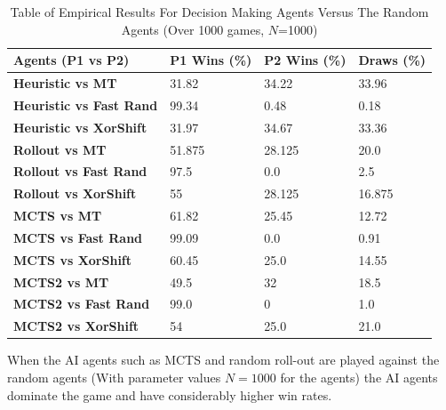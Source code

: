\documentclass[journal]{IEEEtran}
\begin{document}
\begin{table}[H]
  \centering
  \caption{Table of Empirical Results For Decision Making Agents Versus The Random Agents (Over 1000 games, $N$=1000)}
  \label{results-table-rnd-results}
  \begin{tabular}{|l|l|l|l|}
  \hline
  \textbf{Agents (P1 vs P2)}      & \textbf{P1 Wins (\%)} & \textbf{P2 Wins (\%)} & \textbf{Draws (\%)} \\ \hline
  \textbf{Heuristic vs MT}        & 31.82                 & 34.22                 & 33.96               \\ \hline
  \textbf{Heuristic vs Fast Rand} & 99.34                 & 0.48                  & 0.18                \\ \hline
  \textbf{Heuristic vs XorShift}  & 31.97                 & 34.67                 & 33.36               \\ \hline
  \textbf{Rollout vs MT}          & 51.875                & 28.125                & 20.0                \\ \hline
  \textbf{Rollout vs Fast Rand}   & 97.5                  & 0.0                   & 2.5                 \\ \hline
  \textbf{Rollout vs XorShift}    & 55                    & 28.125                & 16.875              \\ \hline
  \textbf{MCTS vs MT}             & 61.82                 & 25.45                 & 12.72               \\ \hline
  \textbf{MCTS vs Fast Rand}      & 99.09                 & 0.0                   & 0.91                \\ \hline
  \textbf{MCTS vs XorShift}       & 60.45                 & 25.0                  & 14.55               \\ \hline
  \textbf{MCTS2 vs MT}            & 49.5                  & 32                    & 18.5                \\ \hline
  \textbf{MCTS2 vs Fast Rand}     & 99.0                  & 0                     & 1.0                 \\ \hline
  \textbf{MCTS2 vs XorShift}      & 54                    & 25.0                  & 21.0                \\ \hline
  \end{tabular}
\end{table}

When the AI agents such as MCTS and random roll-out are played against the random agents (With parameter values $N=1000$ for the agents) the AI agents dominate the game and have considerably higher win rates. \\
\end{document}
